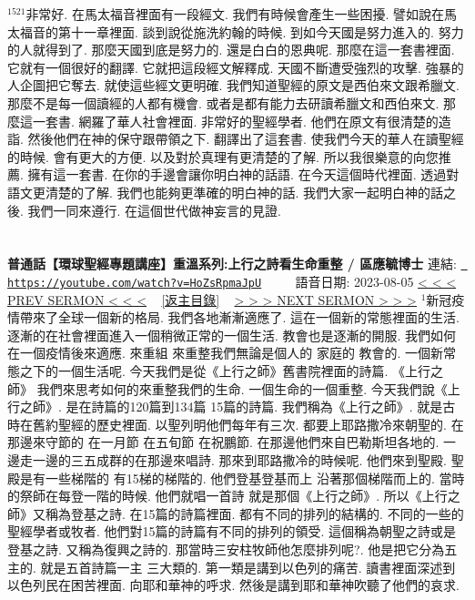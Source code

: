 \documentclass{book}
\begin{document}
$^{1521}$非常好.
在馬太福音裡面有一段經文.
我們有時候會產生一些困擾.
譬如說在馬太福音的第十一章裡面.
談到說從施洗約翰的時候.
到如今天國是努力進入的.
努力的人就得到了.
那麼天國到底是努力的.
還是白白的恩典呢.
那麼在這一套書裡面.
它就有一個很好的翻譯.
它就把這段經文解釋成.
天國不斷遭受強烈的攻擊.
強暴的人企圖把它奪去.
就使這些經文更明確.
我們知道聖經的原文是西伯來文跟希臘文.
那麼不是每一個讀經的人都有機會.
或者是都有能力去研讀希臘文和西伯來文.
那麼這一套書.
網羅了華人社會裡面.
非常好的聖經學者.
他們在原文有很清楚的造詣.
然後他們在神的保守跟帶領之下.
翻譯出了這套書.
使我們今天的華人在讀聖經的時候.
會有更大的方便.
以及對於真理有更清楚的了解.
所以我很樂意的向您推薦.
擁有這一套書.
在你的手邊會讓你明白神的話語.
在今天這個時代裡面.
透過對語文更清楚的了解.
我們也能夠更準確的明白神的話.
我們大家一起明白神的話之後.
我們一同來遵行.
在這個世代做神妄言的見證.
\newpage



\section{}
\label{sec:HoZsRpmaJpU}
\textbf{普通話【環球聖經專題講座】重溫系列:上行之詩看生命重整 / 區應毓博士}
\newline
\newline
連結: \href{https://youtube.com/watch?v=HoZsRpmaJpU}{\texttt{ https://youtube.com/watch?v=HoZsRpmaJpU}} ~~~~ 語音日期: 2023-08-05 
\newline
\newline
\hyperref[sec:wANGDktiD_I]{\small{< < < PREV SERMON < < <}}
~
\hyperref[sec:index]{\small{[返主目錄]}}
~
\hyperref[sec:TijCCzqpfk8]{\small{> > > NEXT SERMON > > >}}
\newline
\newline
$^{1}$新冠疫情帶來了全球一個新的格局.
我們各地漸漸適應了.
這在一個新的常態裡面的生活.
逐漸的在社會裡面進入一個稍微正常的一個生活.
教會也是逐漸的開服.
我們如何在一個疫情後來適應.
來重組 來重整我們無論是個人的 家庭的 教會的.
一個新常態之下的一個生活呢.
今天我們是從《上行之師》舊書院裡面的詩篇.
《上行之師》 我們來思考如何的來重整我們的生命.
一個生命的一個重整.
今天我們說《上行之師》.
是在詩篇的120篇到134篇 15篇的詩篇.
我們稱為《上行之師》.
就是古時在舊約聖經的歷史裡面.
以聖列明他們每年有三次.
都要上耶路撒冷來朝聖的.
在那邊來守節的 在一月節 在五旬節 在祝鵬節.
在那邊他們來自巴勒斯坦各地的.
一邊走一邊的三五成群的在那邊來唱詩.
那來到耶路撒冷的時候呢.
他們來到聖殿.
聖殿是有一些梯階的 有15梯的梯階的.
他們登基登基而上 沿著那個梯階而上的.
當時的祭師在每登一階的時候.
他們就唱一首詩 就是那個《上行之師》.
所以《上行之師》又稱為登基之詩.
在15篇的詩篇裡面.
都有不同的排列的結構的.
不同的一些的聖經學者或牧者.
他們對15篇的詩篇有不同的排列的領受.
這個稱為朝聖之詩或是登基之詩.
又稱為復興之詩的.
那當時三安柱牧師他怎麼排列呢?.
他是把它分為五主的.
就是五首詩篇一主 三大類的.
第一類是講到以色列的痛苦.
讀書裡面深述到以色列民在困苦裡面.
向耶和華神的呼求.
然後是講到耶和華神吹聽了他們的哀求.
\end{document}
